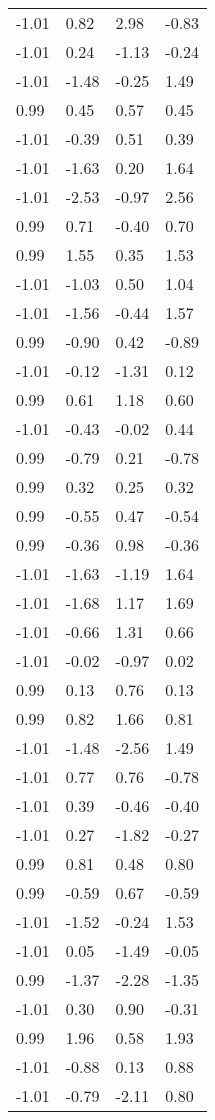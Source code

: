 \documentclass[
  doc,draftall]{apa6}
\begin{document}
\begin{table}[tbp]
\begin{center}
\begin{threeparttable}
\begin{tabular}{llll}
-1.01 & 0.82 & 2.98 & -0.83\\
-1.01 & 0.24 & -1.13 & -0.24\\
-1.01 & -1.48 & -0.25 & 1.49\\
0.99 & 0.45 & 0.57 & 0.45\\
-1.01 & -0.39 & 0.51 & 0.39\\
-1.01 & -1.63 & 0.20 & 1.64\\
-1.01 & -2.53 & -0.97 & 2.56\\
0.99 & 0.71 & -0.40 & 0.70\\
0.99 & 1.55 & 0.35 & 1.53\\
-1.01 & -1.03 & 0.50 & 1.04\\
-1.01 & -1.56 & -0.44 & 1.57\\
0.99 & -0.90 & 0.42 & -0.89\\
-1.01 & -0.12 & -1.31 & 0.12\\
0.99 & 0.61 & 1.18 & 0.60\\
-1.01 & -0.43 & -0.02 & 0.44\\
0.99 & -0.79 & 0.21 & -0.78\\
0.99 & 0.32 & 0.25 & 0.32\\
0.99 & -0.55 & 0.47 & -0.54\\
0.99 & -0.36 & 0.98 & -0.36\\
-1.01 & -1.63 & -1.19 & 1.64\\
-1.01 & -1.68 & 1.17 & 1.69\\
-1.01 & -0.66 & 1.31 & 0.66\\
-1.01 & -0.02 & -0.97 & 0.02\\
0.99 & 0.13 & 0.76 & 0.13\\
0.99 & 0.82 & 1.66 & 0.81\\
-1.01 & -1.48 & -2.56 & 1.49\\
-1.01 & 0.77 & 0.76 & -0.78\\
-1.01 & 0.39 & -0.46 & -0.40\\
-1.01 & 0.27 & -1.82 & -0.27\\
0.99 & 0.81 & 0.48 & 0.80\\
0.99 & -0.59 & 0.67 & -0.59\\
-1.01 & -1.52 & -0.24 & 1.53\\
-1.01 & 0.05 & -1.49 & -0.05\\
0.99 & -1.37 & -2.28 & -1.35\\
-1.01 & 0.30 & 0.90 & -0.31\\
0.99 & 1.96 & 0.58 & 1.93\\
-1.01 & -0.88 & 0.13 & 0.88\\
-1.01 & -0.79 & -2.11 & 0.80\\

\end{tabular}
\end{threeparttable}
\end{center}
\end{table}
\end{document}
